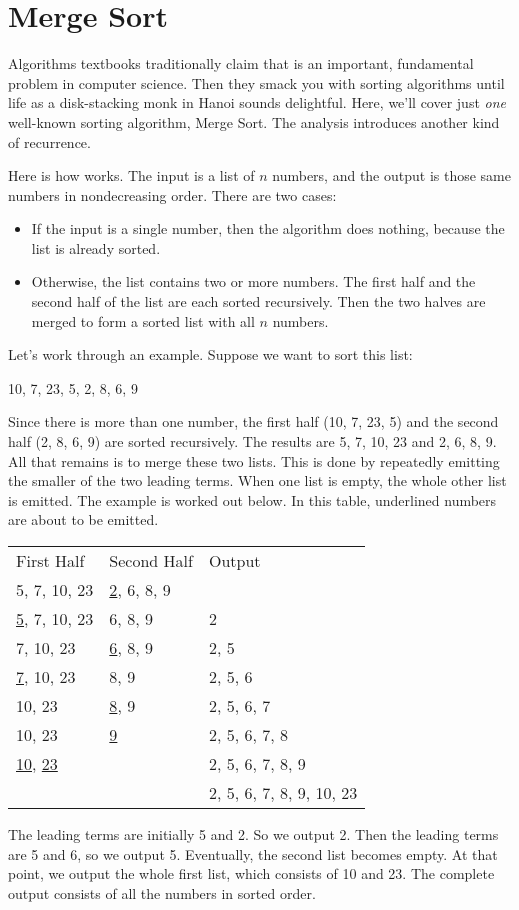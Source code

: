 \section{Merge Sort}

Algorithms textbooks traditionally claim that  is an
important, fundamental problem in computer science.  Then they smack
you with sorting algorithms until life as a disk-stacking monk in
Hanoi sounds delightful.  Here, we'll cover just \emph{one} well-known
sorting algorithm, Merge Sort.  The analysis introduces another kind
of recurrence.

Here is how  works.  The input is a list of $n$
numbers, and the output is those same numbers in nondecreasing order.
There are two cases:
\begin{itemize}
\item If the input is a single number, then the algorithm does nothing,
  because the list is already sorted.
\item Otherwise, the list contains two or more numbers.  The first
  half and the second half of the list are each sorted recursively.
  Then the two halves are merged to form a sorted list with all $n$
  numbers.
\end{itemize}

Let's work through an example.  Suppose we want to sort this list:
\begin{center}
10, 7, 23, 5, 2, 8, 6, 9
\end{center}
Since there is more than one number, the first half (10, 7, 23, 5) and
the second half (2, 8, 6, 9) are sorted recursively.  The results are
5, 7, 10, 23 and 2, 6, 8, 9.  All that remains is to merge these two
lists.  This is done by repeatedly emitting the smaller of the two
leading terms.  When one list is empty, the whole other list is
emitted.  The example is worked out below.   In this table, underlined
numbers are about to be emitted.
\begin{center}
\begin{tabular}{lll}
First Half & Second Half & Output \\
5, 7, 10, 23 & \underline{2}, 6, 8, 9 & \\
\underline{5}, 7, 10, 23 & 6, 8, 9 & 2\\
7, 10, 23 & \underline{6}, 8, 9 & 2, 5 \\
\underline{7}, 10, 23 & 8, 9 & 2, 5, 6 \\
10, 23 & \underline{8}, 9 & 2, 5, 6, 7 \\
10, 23 & \underline{9} & 2, 5, 6, 7, 8 \\
\underline{10}, \underline{23} & & 2, 5, 6, 7, 8, 9 \\
& & 2, 5, 6, 7, 8, 9, 10, 23
\end{tabular}
\end{center}
The leading terms are initially 5 and 2.  So we output 2.  Then the
leading terms are 5 and 6, so we output 5.  Eventually, the second
list becomes empty.  At that point, we output the whole first list,
which consists of 10 and 23.  The complete output consists of all the
numbers in sorted order.

